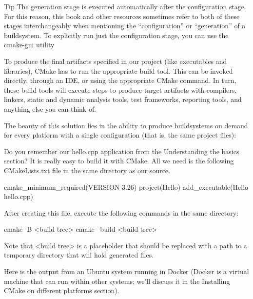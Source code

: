 \begin{myTip}{Tip}
The generation stage is executed automatically after the configuration stage. For this reason, this book and other resources sometimes refer to both of these stages interchangeably when mentioning the “configuration” or “generation” of a buildsystem. To explicitly run just the configuration stage, you can use the cmake-gui utility
\end{myTip}


To produce the final artifacts specified in our project (like executables and libraries), CMake has to run the appropriate build tool. This can be invoked directly, through an IDE, or using the appropriate CMake command. In turn, these build tools will execute steps to produce target artifacts with compilers, linkers, static and dynamic analysis tools, test frameworks, reporting tools, and anything else you can think of.

The beauty of this solution lies in the ability to produce buildsystems on demand for every platform with a single configuration (that is, the same project files):


Do you remember our hello.cpp application from the Understanding the basics section? It is really easy to build it with CMake. All we need is the following CMakeLists.txt file in the same directory as our source.


\begin{cmake}
cmake_minimum_required(VERSION 3.26)
project(Hello)
add_executable(Hello hello.cpp)
\end{cmake}

After creating this file, execute the following commands in the same directory:

\begin{shell}
cmake -B <build tree>
cmake --build <build tree>
\end{shell}

Note that <build tree> is a placeholder that should be replaced with a path to a temporary directory that will hold generated files.

Here is the output from an Ubuntu system running in Docker (Docker is a virtual machine that can run within other systems; we’ll discuss it in the Installing CMake on different platforms section).

